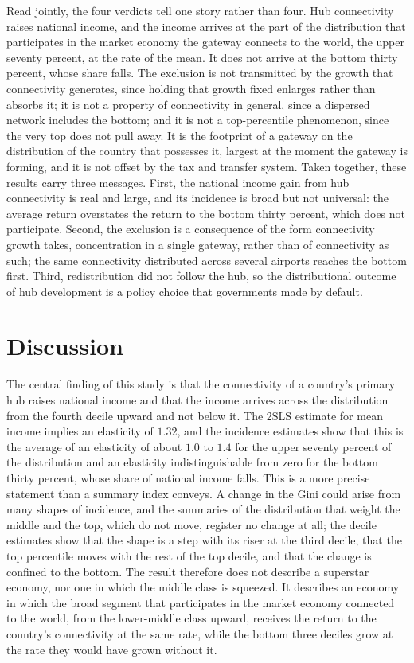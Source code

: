Read jointly, the four verdicts tell one story rather than four. Hub connectivity raises national income, and the income arrives at the part of the distribution that participates in the market economy the gateway connects to the world, the upper seventy percent, at the rate of the mean. It does not arrive at the bottom thirty percent, whose share falls. The exclusion is not transmitted by the growth that connectivity generates, since holding that growth fixed enlarges rather than absorbs it; it is not a property of connectivity in general, since a dispersed network includes the bottom; and it is not a top-percentile phenomenon, since the very top does not pull away. It is the footprint of a gateway on the distribution of the country that possesses it, largest at the moment the gateway is forming, and it is not offset by the tax and transfer system. Taken together, these results carry three messages. First, the national income gain from hub connectivity is real and large, and its incidence is broad but not universal: the average return overstates the return to the bottom thirty percent, which does not participate. Second, the exclusion is a consequence of the form connectivity growth takes, concentration in a single gateway, rather than of connectivity as such; the same connectivity distributed across several airports reaches the bottom first. Third, redistribution did not follow the hub, so the distributional outcome of hub development is a policy choice that governments made by default.

\section{Discussion}
\label{sec:discussion}
The central finding of this study is that the connectivity of a country's primary hub raises national income and that the income arrives across the distribution from the fourth decile upward and not below it. The 2SLS estimate for mean income implies an elasticity of $1.32$, and the incidence estimates show that this is the average of an elasticity of about $1.0$ to $1.4$ for the upper seventy percent of the distribution and an elasticity indistinguishable from zero for the bottom thirty percent, whose share of national income falls. This is a more precise statement than a summary index conveys. A change in the Gini could arise from many shapes of incidence, and the summaries of the distribution that weight the middle and the top, which do not move, register no change at all; the decile estimates show that the shape is a step with its riser at the third decile, that the top percentile moves with the rest of the top decile, and that the change is confined to the bottom. The result therefore does not describe a superstar economy, nor one in which the middle class is squeezed. It describes an economy in which the broad segment that participates in the market economy connected to the world, from the lower-middle class upward, receives the return to the country's connectivity at the same rate, while the bottom three deciles grow at the rate they would have grown without it.

